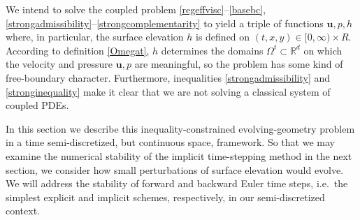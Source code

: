 \documentclass[letterpaper,final,12pt,reqno]{amsart}
\newcommand{\RR}{\mathbb{R}}
\newcommand{\bu}{\mathbf{u}}
\begin{document}
We intend to solve the coupled problem \eqref{regeffvisc}--\eqref{basebc}, \eqref{strongadmissibility}--\eqref{strongcomplementarity} to yield a triple of functions $\bu,p,h$ where, in particular, the surface elevation $h$ is defined on $(t,x,y) \in [0,\infty)\times R$.  According to definition \eqref{Omegat}, $h$ determines the domains $\Omega^t\subset \RR^d$ on which the velocity and pressure $\bu,p$ are meaningful, so the problem has some kind of free-boundary character.  Furthermore, inequalities \eqref{strongadmissibility} and \eqref{stronginequality} make it clear that we are not solving a classical system of coupled PDEs.

In this section we describe this inequality-constrained evolving-geometry problem in a time semi-discretized, but continuous space, framework.  So that we may examine the numerical stability of the implicit time-stepping method in the next section, we consider how small perturbations of surface elevation would evolve.  We will address the stability of forward and backward Euler time steps, i.e.~the simplest explicit and implicit schemes, respectively, in our semi-discretized context.
\end{document}
